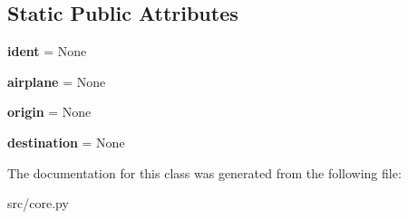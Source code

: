 \subsection*{Static Public Attributes}
\begin{DoxyCompactItemize}
\item 
\mbox{\label{classcore_1_1_flight_afeae7e42aaa168fea5564b91150b58f8}} 
{\bfseries ident} = None
\item 
\mbox{\label{classcore_1_1_flight_adb57c4d29d5e22853095f4d45ba15a53}} 
{\bfseries airplane} = None
\item 
\mbox{\label{classcore_1_1_flight_ab4c29bc135d1ddbcb0fa92911a5c8e9c}} 
{\bfseries origin} = None
\item 
\mbox{\label{classcore_1_1_flight_afac9c7ad60f52d8b053e5253fd2f1748}} 
{\bfseries destination} = None
\end{DoxyCompactItemize}


The documentation for this class was generated from the following file\+:\begin{DoxyCompactItemize}
\item 
src/core.\+py\end{DoxyCompactItemize}
